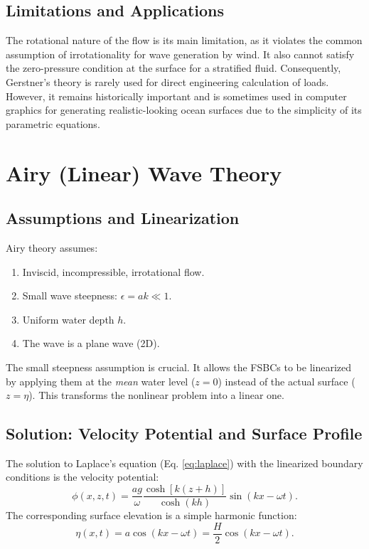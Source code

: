 \documentclass[11pt,letterpaper]{article}
\begin{document}
    \subsection{Limitations and Applications}
    The rotational nature of the flow is its main limitation, as it violates the common assumption of irrotationality for wave generation by wind. It also cannot satisfy the zero-pressure condition at the surface for a stratified fluid. Consequently, Gerstner's theory is rarely used for direct engineering calculation of loads. However, it remains historically important and is sometimes used in computer graphics for generating realistic-looking ocean surfaces due to the simplicity of its parametric equations.

    \section{Airy (Linear) Wave Theory}
    \subsection{Assumptions and Linearization}
    Airy theory assumes:
    \begin{enumerate}
        \item Inviscid, incompressible, irrotational flow.
        \item Small wave steepness: $\epsilon = ak \ll 1$.
        \item Uniform water depth $h$.
        \item The wave is a plane wave (2D).
    \end{enumerate}
    The small steepness assumption is crucial. It allows the FSBCs to be linearized by applying them at the \emph{mean} water level ($z=0$) instead of the actual surface ($z=\eta$). This transforms the nonlinear problem into a linear one.

    \subsection{Solution: Velocity Potential and Surface Profile}
    The solution to Laplace's equation (Eq. \ref{eq:laplace}) with the linearized boundary conditions is the velocity potential:
    \begin{equation}
        \phi(x,z,t) = \frac{a g}{\omega} \frac{\cosh[k(z+h)]}{\cosh(kh)} \sin(kx - \omega t).
        \label{eq:airypotential}
    \end{equation}
    The corresponding surface elevation is a simple harmonic function:
    \begin{equation}
        \eta(x,t) = a \cos(kx - \omega t) = \frac{H}{2} \cos(kx - \omega t).
        \label{eq:airyeta}
    \end{equation}
\end{document}
